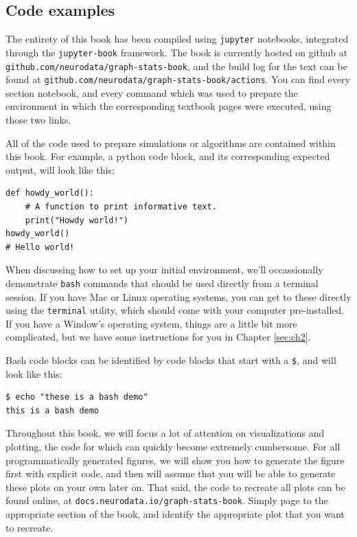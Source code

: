 \subsection*{Code examples}

The entirety of this book has been compiled using \texttt{jupyter} notebooks, integrated through the \texttt{jupyter-book} framework. The book is currently hosted on github at \texttt{github.com/neurodata/graph-stats-book}, and the build log for the text can be found at \texttt{github.com/neurodata/graph-stats-book/actions}. You can find every section notebook, and every command which was used to prepare the environment in which the corresponding textbook pages were executed, using those two links. 

All of the code used to prepare simulations or algorithms are contained within this book. For example, a python code block, and its corresponding expected output, will look like this:
\begin{lstlisting}[style=python]
def howdy_world():
    # A function to print informative text.
    print("Howdy world!")
howdy_world()
# Hello world!
\end{lstlisting}

When discussing how to set up your initial environment, we'll occassionally demonstrate \texttt{bash} commands that should be used directly from a terminal session. If you have Mac or Linux operating systems, you can get to these directly using the \texttt{terminal} utility, which should come with your computer pre-installed. If you have a Window's operating system, things are a little bit more complicated, but we have some instructions for you in Chapter \ref{sec:ch2}.

Bash code blocks can be identified by code blocks that start with a \texttt{\$}, and will look like this:

\begin{lstlisting}[style=bash]
$ echo "these is a bash demo"
this is a bash demo
\end{lstlisting}


Throughout this book, we will focus a lot of attention on visualizations and plotting, the code for which can quickly become extremely cumbersome. For all programmatically generated figures, we will show you how to generate the figure first with explicit code, and then will assume that you will be able to generate these plots on your own later on. That said, the code to recreate all plots can be found online, at \texttt{docs.neurodata.io/graph-stats-book}. Simply page to the appropriate section of the book, and identify the appropriate plot that you want to recreate. 

